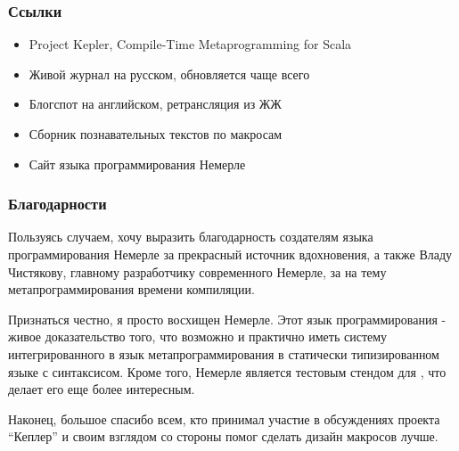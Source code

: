 \documentclass{beamer}
\begin{document}
\begin{frame}[t]
\frametitle{Ссылки}
\begin{itemize}

\item Project Kepler, Compile-Time Metaprogramming for Scala\\

\item Живой журнал на русском, обновляется чаще всего\\

\item Блогспот на английском, ретрансляция из ЖЖ\\

\item Сборник познавательных текстов по макросам\\

\item Сайт языка программирования Немерле\\

\end{itemize}
\end{frame}

\begin{frame}[t]
\frametitle{Благодарности}

Пользуясь случаем, хочу выразить благодарность создателям языка программирования Немерле за прекрасный источник вдохновения, а также Владу Чистякову, главному разработчику современного Немерле, за  на тему метапрограммирования времени компиляции.

Признаться честно, я просто восхищен Немерле. Этот язык программирования - живое доказательство того, что возможно и практично иметь систему интегрированного в язык метапрограммирования в статически типизированном языке с синтаксисом. Кроме того, Немерле является тестовым стендом для , что делает его еще более интересным.

Наконец, большое спасибо всем, кто принимал участие в обсуждениях проекта ``Кеплер'' и своим взглядом со стороны помог сделать дизайн макросов лучше.
\end{frame}
\end{document}
